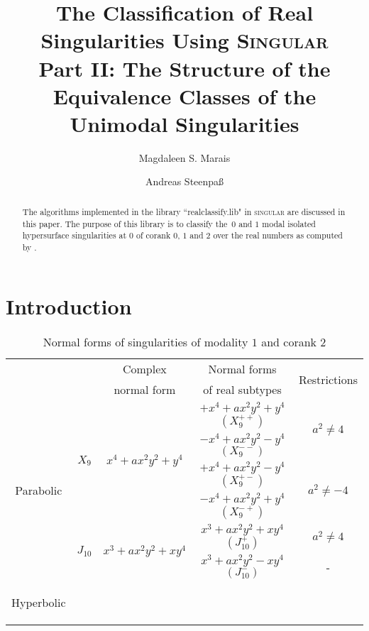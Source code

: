 \documentclass[noend]{amsproc}
\title[The Classification of Real Singularities Using \textsc{Singular}, %
Part II]%
{The Classification of Real Singularities Using \textsc{Singular}\\
Part II: The Structure of the Equivalence Classes of the Unimodal %
Singularities}
\author{Magdaleen S. Marais}
\author{Andreas Steenpa\ss}
\theoremstyle{definition}
\begin{document}
\begin{abstract}
The algorithms implemented in the library ``realclassify.lib" in
\textsc{singular} are discussed in this paper. The purpose of this library is
to classify the~$0$ and $1$ modal isolated hypersurface singularities at $0$ of
corank $0$, $1$ and $2$ over the real numbers as computed by \citet{AVG1985}.
\end{abstract}
\maketitle


\section{Introduction}

\begin{table}[tp]
\centering
\caption{Normal forms of singularities of modality $1$ and corank $2$}
\label{tab:normal_forms}
\begin{tabular}{|c|c|c|c|c|}
\hline

\multicolumn{1}{|c}{}
 & & Complex     & Normal forms     & \multirow{2}{*}{Restrictions} \\
\multicolumn{1}{|c}{}
 & & normal form & of real subtypes &                               \\
\hline\hline


\multirow{6}{*}{\begin{sideways}Parabolic\end{sideways}}

& \multirow{4}{*}{$X_9$} & \multirow{4}{*}{$x^4+ax^2y^2+y^4$}
  & $+x^4+ax^2y^2+y^4$ $(X_9^{++})$ & \multirow{2}{*}{$a^2\neq4$} \\\cline{4-4}
&&& $-x^4+ax^2y^2-y^4$ $(X_9^{--})$ &                             \\\cline{4-5}
&&& $+x^4+ax^2y^2-y^4$ $(X_9^{+-})$ & \multirow{2}{*}{$a^2\neq-4$}\\\cline{4-4}
&&& $-x^4+ax^2y^2+y^4$ $(X_9^{-+})$ &                             \\\cline{2-5}

& \multirow{2}{*}{$J_{10}$} & \multirow{2}{*}{$x^3+ax^2y^2+xy^4$}
  & $x^3+ax^2y^2+xy^4$ $(J_{10}^+)$ & $a^2 \neq 4$ \\ \cline{4-5}
&&& $x^3+ax^2y^2-xy^4$ $(J_{10}^-)$ & -            \\ \hline


\multirow{12}{*}{\begin{sideways}Hyperbolic\end{sideways}}


\end{tabular}
\end{table}
\end{document}
